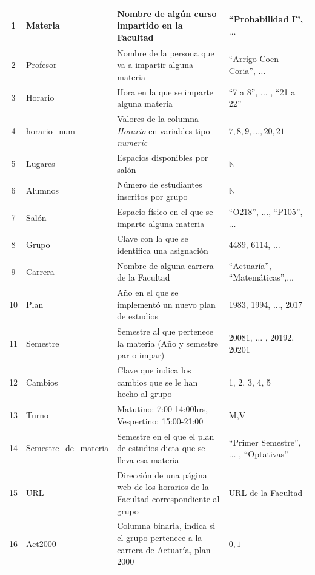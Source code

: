 {\begin{longtable}{|c|l|p{7cm}|p{2.6cm}|}
1 & Materia & Nombre de algún curso impartido en la Facultad & ``Probabilidad I'', $\ldots$ \\ 
\hline 
2 & Profesor & Nombre de la persona que va a impartir alguna materia & ``Arrigo Coen Coria'', $\ldots$ \\ 
\hline 
3 & Horario & Hora en la que se imparte alguna materia & ``7 a 8'', $\ldots$ , ``21 a 22'' \\ 
\hline
4 & horario\_num & Valores de la columna \textit{Horario} en variables tipo \textit{numeric} & $7,8,9,\ldots,20,21$ \\ 
\hline
5 & Lugares & Espacios disponibles por salón & $\mathbb{N}$ \\ 
\hline 
6 & Alumnos & Número de estudiantes inscritos por grupo & $\mathbb{N}$ \\ 
\hline 
7 & Salón & Espacio físico en el que se imparte alguna materia & ``O218'', ..., ``P105'', $\ldots$ \\ 
\hline 
8 & Grupo & Clave con la que se identifica una asignación & 4489, 6114, $\ldots$ \\ 
\hline 
9 & Carrera & Nombre de alguna carrera de la Facultad & ``Actuaría'', ``Matemáticas'',... \\ 
\hline 
10 & Plan & Año en el que se implementó un nuevo plan de estudios & 1983, 1994, ..., 2017 \\ 
\hline 
11 & Semestre & Semestre al que pertenece la materia (Año y semestre par o impar) & 20081, $\ldots$ , 20192, 20201 \\ 
\hline 
12 & Cambios & Clave que indica los cambios que se le han hecho al grupo & 1, 2, 3, 4, 5 \\ 
\hline 
13 & Turno & Matutino: 7:00-14:00hrs, Vespertino: 15:00-21:00 & M,V \\ 
\hline 
14 & Semestre\_de\_materia & Semestre en el que el plan de estudios dicta que se lleva esa materia & ``Primer Semestre'', $\ldots$ , ``Optativas'' \\ 
\hline 
15 & URL & Dirección de una página web de los horarios de la Facultad correspondiente al grupo & URL de la Facultad \\ 
\hline 
16 & Act2000 & Columna binaria, indica si el grupo pertenece a la carrera de Actuaría, plan 2000 & $0,1$\\

\end{longtable}}
